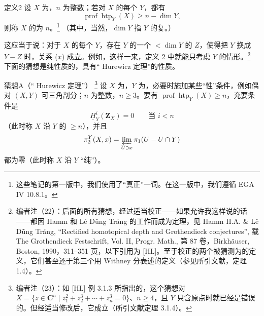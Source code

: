 \begin{SGAresult}{定义}{2}
设 $X$ 为，$n$ 为整数；若对 $X$ 的每个 $Y$，都有
\[
\operatorname{prof}\operatorname{htp}_Y(X)\geq n-\dim Y,\tag{$x$}
\]
则称 $X$ 的为 $n$。\footnote{这些笔记的第一版中，我们使用了“真正”一词。在这一版中，我们遵循 EGA IV 10.8.1。}
（其中，当然，$\dim Y$ 指 $Y$ 的复。）
\end{SGAresult}
这应当于说：对于 $X$ 的每个 $Y$，存在 $Y$ 的一个 $<\dim Y$ 的 $Z$，使得把 $Y$ 换成 $Y-Z$ 时，关系 ($x$) 成立。例如，这样一来，定义 2 中就能只考虑 $Y$ 的情形。\footnote{编者注（22）：后面的所有猜想，经过适当校正——如果允许我这样说的话——都因 Hamm 和 Lê Dũng Tráng 的工作而成为定理，见 Hamm H.A. \& Lê Dũng Tráng, “Rectified homotopical depth and Grothendieck conjectures”, 载 The Grothendieck Festschrift, Vol. II, Progr. Math., 第 87 卷，Birkhäuser, Boston, 1990，311--351 页，以下引用为 [HL]。至于校正的两个被猜测为的定义，它们甚至还于第三个用 Withney 分表述的定义（参见所引文献，定理 1.4）。}
下面的猜想是纯性质的，具有“ Hurewicz 定理”的性质。

\begin{SGAresult}{猜想}{A（“ Hurewicz 定理”）}
\footnote{编者注（23）：如 [HL] 例 3.1.3 所指出的，这个猜想对 $X=\{z\in\mathbf C^n\mid z_1^2+z_2^3+\cdots+z_n^3=0\}$、$n\geq4$，且 $Y$ 只含原点时就已经是错误的。但经适当修改后，它成立（所引文献定理 3.1.4）。}
设 $X$ 为，$Y$ 为，必要时施加某些“性”条件，例如偶对 $(X,Y)$ 可三角剖分；$n$ 为整数，$n\geq3$。要有 $\operatorname{prof}\operatorname{htp}_Y(X)\geq n$，充要条件是
\[
\underline H^i_Y(\mathbf Z_X)=0\qquad\text{当 }i<n
\]
（此时称 $X$ 沿 $Y$ 的 $\geq n$），并且
\[
\pi_2^Y(X,x)=\varprojlim_{U\ni x}\pi_1(U-U\cap Y)
\]
都为零（此时称 $X$ 沿 $Y$ “纯”）。
\end{SGAresult}

